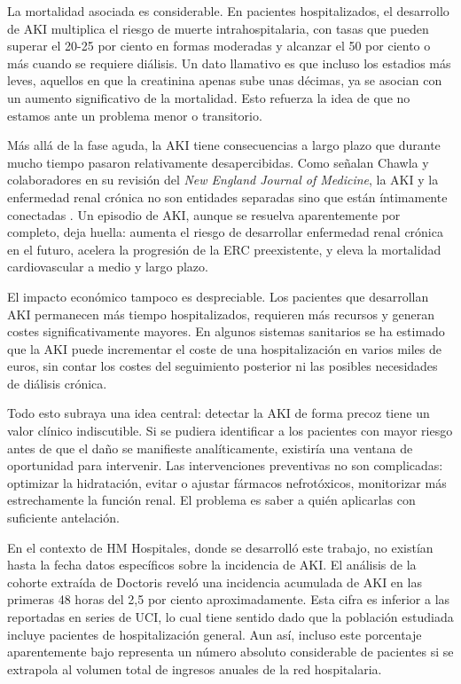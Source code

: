 \documentclass[12pt, a4paper, oneside]{report}
\begin{document}
La mortalidad asociada es considerable. En pacientes hospitalizados, el desarrollo de AKI multiplica el riesgo de muerte intrahospitalaria, con tasas que pueden superar el 20-25 por ciento en formas moderadas y alcanzar el 50 por ciento o más cuando se requiere diálisis. Un dato llamativo es que incluso los estadios más leves, aquellos en que la creatinina apenas sube unas décimas, ya se asocian con un aumento significativo de la mortalidad. Esto refuerza la idea de que no estamos ante un problema menor o transitorio.

Más allá de la fase aguda, la AKI tiene consecuencias a largo plazo que durante mucho tiempo pasaron relativamente desapercibidas. Como señalan Chawla y colaboradores en su revisión del \textit{New England Journal of Medicine}, la AKI y la enfermedad renal crónica no son entidades separadas sino que están íntimamente conectadas \parencite{chawla2014akickd}. Un episodio de AKI, aunque se resuelva aparentemente por completo, deja huella: aumenta el riesgo de desarrollar enfermedad renal crónica en el futuro, acelera la progresión de la ERC preexistente, y eleva la mortalidad cardiovascular a medio y largo plazo.

El impacto económico tampoco es despreciable. Los pacientes que desarrollan AKI permanecen más tiempo hospitalizados, requieren más recursos y generan costes significativamente mayores. En algunos sistemas sanitarios se ha estimado que la AKI puede incrementar el coste de una hospitalización en varios miles de euros, sin contar los costes del seguimiento posterior ni las posibles necesidades de diálisis crónica.

Todo esto subraya una idea central: detectar la AKI de forma precoz tiene un valor clínico indiscutible. Si se pudiera identificar a los pacientes con mayor riesgo antes de que el daño se manifieste analíticamente, existiría una ventana de oportunidad para intervenir. Las intervenciones preventivas no son complicadas: optimizar la hidratación, evitar o ajustar fármacos nefrotóxicos, monitorizar más estrechamente la función renal. El problema es saber a quién aplicarlas con suficiente antelación.

En el contexto de HM Hospitales, donde se desarrolló este trabajo, no existían hasta la fecha datos específicos sobre la incidencia de AKI. El análisis de la cohorte extraída de Doctoris reveló una incidencia acumulada de AKI en las primeras 48 horas del 2,5 por ciento aproximadamente. Esta cifra es inferior a las reportadas en series de UCI, lo cual tiene sentido dado que la población estudiada incluye pacientes de hospitalización general. Aun así, incluso este porcentaje aparentemente bajo representa un número absoluto considerable de pacientes si se extrapola al volumen total de ingresos anuales de la red hospitalaria.
\end{document}
